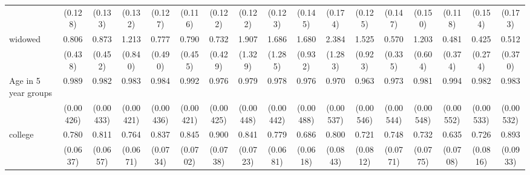 {\begin{tabular}{l*{16}{c}}
                    &     (0.128)         &     (0.133)         &     (0.132)         &     (0.127)         &     (0.116)         &     (0.122)         &     (0.122)         &     (0.123)         &     (0.145)         &     (0.174)         &     (0.125)         &     (0.147)         &     (0.150)         &     (0.118)         &     (0.154)         &     (0.173)         \\
[1em]
widowed             &       0.806         &       0.873         &       1.213         &       0.777         &       0.790         &       0.732         &       1.907         &       1.686         &       1.680         &       2.384         &       1.525         &       0.570         &       1.203         &       0.481         &       0.425         &       0.512         \\
                    &     (0.438)         &     (0.452)         &     (0.840)         &     (0.490)         &     (0.455)         &     (0.429)         &     (1.329)         &     (1.285)         &     (0.932)         &     (1.283)         &     (0.923)         &     (0.335)         &     (0.604)         &     (0.374)         &     (0.274)         &     (0.370)         \\
[1em]
Age in 5 year groups&       0.989\sym{*}  &       0.982\sym{***}&       0.983\sym{***}&       0.984\sym{***}&       0.992\sym{*}  &       0.976\sym{***}&       0.979\sym{***}&       0.978\sym{***}&       0.976\sym{***}&       0.970\sym{***}&       0.963\sym{***}&       0.973\sym{***}&       0.981\sym{***}&       0.994         &       0.982\sym{***}&       0.983\sym{**} \\
                    &   (0.00426)         &   (0.00433)         &   (0.00421)         &   (0.00436)         &   (0.00421)         &   (0.00425)         &   (0.00448)         &   (0.00442)         &   (0.00488)         &   (0.00537)         &   (0.00546)         &   (0.00544)         &   (0.00548)         &   (0.00552)         &   (0.00533)         &   (0.00532)         \\
[1em]
college             &       0.780\sym{**} &       0.811\sym{**} &       0.764\sym{**} &       0.837\sym{*}  &       0.845\sym{*}  &       0.900         &       0.841\sym{*}  &       0.779\sym{**} &       0.686\sym{***}&       0.800\sym{*}  &       0.721\sym{**} &       0.748\sym{**} &       0.732\sym{**} &       0.635\sym{***}&       0.726\sym{**} &       0.893         \\
                    &    (0.0637)         &    (0.0657)         &    (0.0671)         &    (0.0734)         &    (0.0702)         &    (0.0738)         &    (0.0723)         &    (0.0681)         &    (0.0618)         &    (0.0843)         &    (0.0812)         &    (0.0771)         &    (0.0775)         &    (0.0708)         &    (0.0816)         &    (0.0933)         \\

\end{tabular}}
